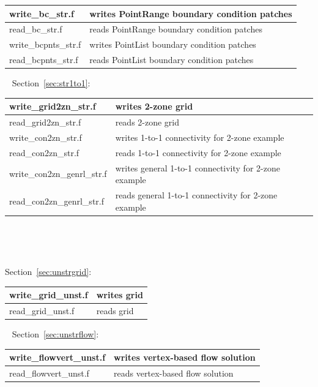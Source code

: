 \documentclass[12pt]{article}
\begin{document}
\begin{tabular}{ | l | l | }
\hline
write\_bc\_str.f           & writes PointRange boundary condition patches \\ \hline
read\_bc\_str.f            & reads PointRange boundary condition patches \\ \hline
write\_bcpnts\_str.f       & writes PointList boundary condition patches \\ \hline
read\_bcpnts\_str.f        & reads PointList boundary condition patches \\ \hline
\end{tabular}

~\newline
Section~\ref{sec:str1to1}:

\begin{tabular}{ | l | l | }
\hline
write\_grid2zn\_str.f      & writes 2-zone grid \\ \hline
read\_grid2zn\_str.f       & reads 2-zone grid \\ \hline
write\_con2zn\_str.f       & writes 1-to-1 connectivity for 2-zone example \\ \hline
read\_con2zn\_str.f        & reads 1-to-1 connectivity for 2-zone example \\ \hline
write\_con2zn\_genrl\_str.f & writes general 1-to-1 connectivity for 2-zone example \\ \hline
read\_con2zn\_genrl\_str.f  & reads general 1-to-1 connectivity for 2-zone example \\ \hline
\end{tabular}

~\newline

~\newline
{}

\noindent Section~\ref{sec:unstrgrid}:

\begin{tabular}{ | l | l | }
\hline
write\_grid\_unst.f        & writes grid \\ \hline
read\_grid\_unst.f         & reads grid \\ \hline
\end{tabular}

~\newline
Section~\ref{sec:unstrflow}:

\begin{tabular}{ | l | l | }
\hline
write\_flowvert\_unst.f    & writes vertex-based flow solution \\ \hline
read\_flowvert\_unst.f     & reads vertex-based flow solution \\ \hline
\end{tabular}
\end{document}
